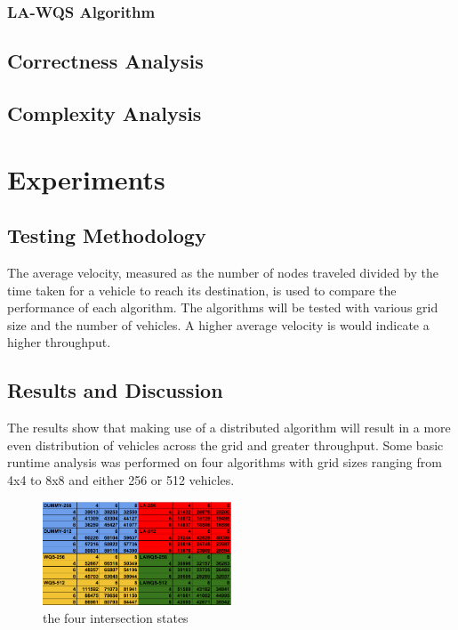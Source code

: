 \documentclass[conference]{IEEEtran}
\begin{document}
\subsubsection{ LA-WQS Algorithm}

\subsection{Correctness Analysis}

\subsection{ Complexity Analysis}


\section{Experiments}
\subsection{Testing Methodology}
The average velocity, measured as the number of nodes traveled divided by the time taken for a vehicle to reach its destination, is used to compare the performance of each algorithm. The algorithms will be tested with various grid size and the number of vehicles. A higher average velocity is would indicate a higher throughput.

\subsection{Results and Discussion}
The results show that making use of a distributed algorithm will result in a more even distribution of vehicles across the grid and greater throughput. Some basic runtime analysis was performed on four algorithms with grid sizes ranging from 4x4 to 8x8 and either 256 or 512 vehicles.

\begin{figure}[h]
    \center    
    \includegraphics[width=0.5\textwidth]{images/simulation_duration.png}
	\caption{the four intersection states}
	\label{intersection_states}
\end{figure}
\end{document}
